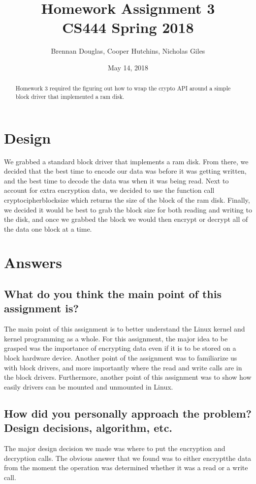 \documentclass[onecolumn, draftclsnofoot,10pt, compsoc]{IEEEtran}
\title{Homework Assignment 3\\\large CS444 Spring 2018}
\author{Brennan Douglas, Cooper Hutchins, Nicholas Giles}
\date{May 14, 2018}
\begin{document}
\begin{titlingpage}
			\maketitle
      \begin{abstract}
			\noindent Homework 3 required the figuring out how to wrap the crypto API around a simple block driver that implemented a ram disk.
      \end{abstract}
\end{titlingpage}

\newpage
{}

\clearpage
\singlespace


\section{Design}
We grabbed a standard block driver that implements a ram disk. \cite{block_driver} From there, we decided that the best time to encode our data was before it was getting written, and the best time to decode the data was when it was being read. Next to account for extra encryption data, we decided to use the function call crypto\textunderscore cipher\textunderscore blocksize which returns the size of the block of the ram disk. Finally, we decided it would be best to grab the block size for both reading and writing to the disk, and once we grabbed the block we would then encrypt or decrypt all of the data one block at a time.

\section {Answers}
\subsection{What do you think the main point of this assignment is?}
The main point of this assignment is to better understand the Linux kernel and kernel programming as a whole. For this assignment, the major idea to be grasped was the importance of encrypting data even if it is to be stored on a block hardware device. Another point of the assignment was to familiarize us with block drivers, and more importantly where the read and write calls are in the block drivers. Furthermore, another point of this assignment was to show how easily drivers can be mounted and unmounted in Linux.

\subsection{How did you personally approach the problem? Design decisions, algorithm, etc.}
The major design decision we made was where to put the encryption and decryption calls. The obvious answer that we found was to either encrypt\decrypt the data from the moment the operation was determined whether it was a read or a write call.
\end{document}

